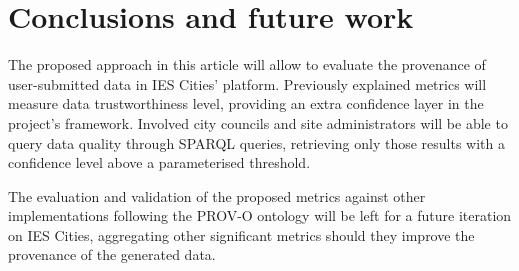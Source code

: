 \section{Conclusions and future work}
\label{sec:conclusions}

The proposed approach in this article will allow to evaluate the provenance of user-submitted data in IES Cities' platform. Previously explained metrics will measure data trustworthiness level, providing an extra confidence layer in the project's framework. Involved city councils and site administrators will be able to query data quality through SPARQL queries, retrieving only those results with a confidence level above a parameterised threshold.

The evaluation and validation of the proposed metrics against other implementations following the PROV-O ontology will be left for a future iteration on IES Cities, aggregating other significant metrics should they improve the provenance of the generated data.
